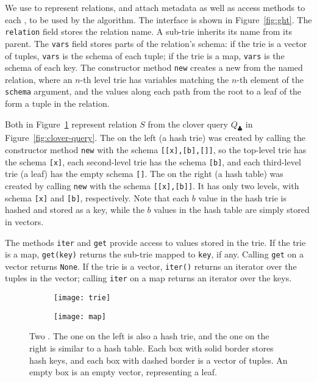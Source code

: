 We use \GHTs to represent relations,
and attach metadata as well as access methods
to each \GHT, to be used by the \FJ algorithm.
The \GHT interface is shown in Figure~\ref{fig:ght}.
The \lstinline|relation| field stores the relation name.
A sub-trie inherits its name from its parent.
The \lstinline|vars| field stores parts of the relation's schema:
if the trie is a vector of tuples,
\lstinline|vars| is the schema of each tuple;
if the trie is a map,
\lstinline|vars| is the schema of each key.
The constructor method \lstinline|new| creates a new \GHT from the named relation,
where an $n$-th level trie has variables
matching the $n$-th element of the \lstinline|schema| argument,
and the values along each path from the root to a leaf of the \GHT
form a tuple in the relation.

\begin{example}
  Both \GHTs in Figure~\ref{fig:ght-examples} represent relation $S$ from the
  clover query $Q_\clubsuit$ in Figure~\ref{fig:clover-query}.  The
  \GHT on the left (a hash trie) was created by calling the
  constructor method \lstinline|new| with the schema
  \lstinline|[[x],[b],[]]|, so the top-level trie has the schema
  \lstinline|[x]|, each second-level trie has the schema
  \lstinline|[b]|, and each third-level trie (a leaf) has the empty
  schema \lstinline|[]|.  The \GHT on the right (a hash table) was
  created by calling \lstinline|new| with the schema
  \lstinline|[[x],[b]]|.  It has only two levels, with schema
  \lstinline|[x]| and \lstinline|[b]|, respectively.  Note that each
  $b$ value in the hash trie is hashed and stored as a key, while the
  $b$ values in the hash table are simply stored in vectors.
\end{example}

The methods \lstinline|iter| and \lstinline|get|
provide access to values stored in the trie.
If the trie is a map,
\lstinline|get(key)| returns the sub-trie mapped to \lstinline|key|,
if any.
Calling \texttt{get} on a vector returns \lstinline|None|.
If the trie is a vector,
\lstinline|iter()|
returns an iterator over the tuples in the vector;
calling \texttt{iter} on a map
returns an iterator over the keys.

\begin{figure}
  \centering
  \begin{subfigure}[c]{0.3\linewidth}
    \texttt{[image: trie]}
  \end{subfigure}\hspace{1.5cm}%
  \begin{subfigure}[c]{0.3\linewidth}
    \texttt{[image: map]}
  \end{subfigure}
  \caption{
    Two \GHTs. The one on the left is also a hash trie,
    and the one on the right is similar to a hash table.
    Each box with solid border stores hash keys,
    and each box with dashed border is a vector of tuples.
    An empty box is an empty vector, representing a leaf.
  }
  \label{fig:ght-examples}
\end{figure}

